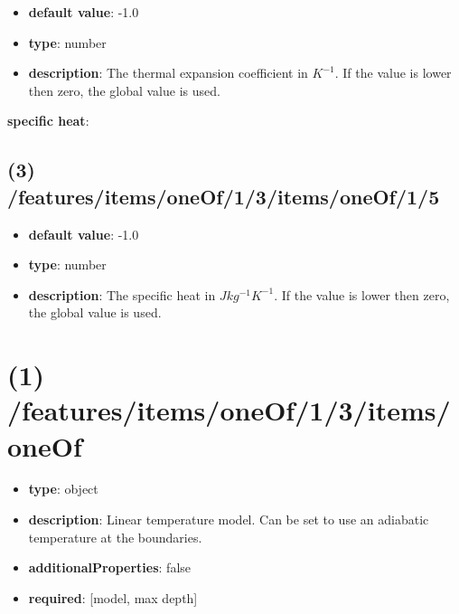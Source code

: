 \begin{itemize}[leftmargin=3em]\item {\bf default value}: -1.0
\item {\bf type}: number
\item {\bf description}: The thermal expansion coefficient in $K^{-1}$. If the value is lower then zero, the global value is used.
\end{itemize}\item {\bf specific heat}: \subsection{(3) /features/items/oneOf/1/3/items/oneOf/1/5}
\begin{itemize}[leftmargin=3em]\item {\bf default value}: -1.0
\item {\bf type}: number
\item {\bf description}: The specific heat in $J kg^{-1} K^{-1}$. If the value is lower then zero, the global value is used.
\end{itemize}\section{(1) /features/items/oneOf/1/3/items/oneOf}
\begin{itemize}[leftmargin=1em]\item {\bf type}: object
\item {\bf description}: Linear temperature model. Can be set to use an adiabatic temperature at the boundaries.
\item {\bf additionalProperties}: false
\item {\bf required}: [model, max depth]\end{itemize}
